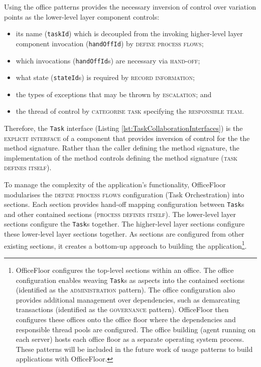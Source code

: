 \documentclass[prodmode]{style/acmlarge}
\begin{document}
Using the office patterns provides the necessary inversion of control over
variation points as the lower-level layer component controls:
\begin{itemize}
  \item its name (\texttt{taskId}) which is decoupled from the invoking higher-level layer component invocation (\texttt{handOffId}) by \textsc{define process flows};
  \item which invocations (\texttt{handOffId}s) are necessary via \textsc{hand-off};
  \item what state (\texttt{stateId}s) is required by \textsc{record information};
  \item the types of exceptions that may be thrown by \textsc{escalation}; and
  \item the thread of control by \textsc{categorise task} specifying the \textsc{responsible team}.
\end{itemize}

Therefore, the \texttt{Task} interface (Listing
\ref{lst:TaskCollaborationInterfaces}) is the \textsc{explicit interface} of a
component that provides inversion of control for the the method signature. 
Rather than the caller defining the method signature, the implementation of the
method controls defining the method signature (\textsc{task defines itself}).

To manage the complexity of the application's functionality, OfficeFloor
modularises the \textsc{define process flows} configuration (Task Orchestration)
into sections.  Each section provides hand-off mapping configuration between
\texttt{Task}s and other contained sections (\textsc{process defines itself}).
The lower-level layer sections configure the \texttt{Task}s together.  The
higher-level layer sections configure these lower-level layer sections together.
As sections are configured from other existing sections, it creates a bottom-up
approach to building the application\footnote{OfficeFloor configures the
top-level sections within an office.  The office configuration enables weaving
\texttt{Task}s as aspects into the contained sections (identified as the
\textsc{administration} pattern).  The office configuration also provides
additional management over dependencies, such as demarcating transactions
(identified as the \textsc{governance} pattern). OfficeFloor then configures
these offices onto the office floor where the dependencies and responsible
thread pools are configured.  The office building (agent running on each server)
hosts each office floor as a separate operating system process.  These patterns
will be included in the future work of usage patterns to build applications with
OfficeFloor.}.
\end{document}
